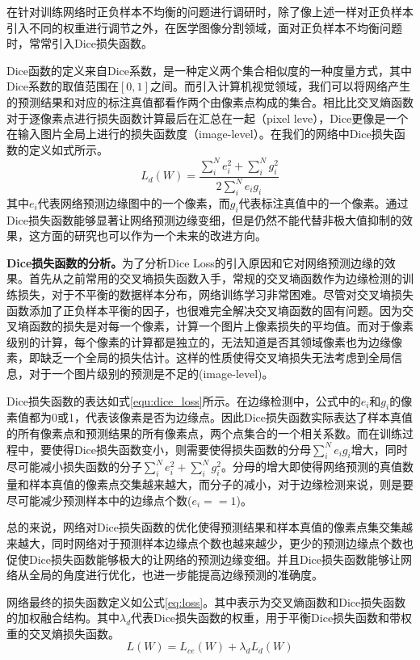 \documentclass[master]{thesis-uestc}
\begin{document}
{在针对训练网络时正负样本不均衡的问题进行调研时，除了像上述一样对正负样本引入不同的权重进行调节之外，在医学图像分割领域，面对正负样本不均衡问题时，常常引入Dice损失函数。

Dice函数的定义来自Dice系数，是一种定义两个集合相似度的一种度量方式，其中Dice系数的取值范围在$[0,1]$之间。而引入计算机视觉领域，我们可以将网络产生的预测结果和对应的标注真值都看作两个由像素点构成的集合。相比比交叉熵函数对于逐像素点进行损失函数计算最后在汇总在一起（pixel leve），Dice更像是一个在输入图片全局上进行的损失函数度（image-level）。在我们的网络中Dice损失函数的定义如式所示。
\begin{equation}
    L_{d}(W) = \frac{\sum_{i}^{N}e_{i}^{2} + \sum_{i}^{N}g_{i}^{2}}{2\sum_{i}^{N}e_{i}g_{i}}
    \label{equ:dice_loss}
\end{equation}
其中$e_{i}$代表网络预测边缘图中的一个像素，而$g_i$代表标注真值中的一个像素。通过Dice损失函数能够显著让网络预测边缘变细，但是仍然不能代替非极大值抑制的效果，这方面的研究也可以作为一个未来的改进方向。

\textbf{Dice损失函数的分析。}为了分析Dice Loss的引入原因和它对网络预测边缘的效果。首先从之前常用的交叉墒损失函数入手，常规的交叉墒函数作为边缘检测的训练损失，对于不平衡的数据样本分布，网络训练学习非常困难。尽管对交叉墒损失函数添加了正负样本平衡的因子，也很难完全解决交叉墒函数的固有问题。因为交叉墒函数的损失是对每一个像素，计算一个图片上像素损失的平均值。而对于像素级别的计算，每个像素的计算都是独立的，无法知道是否其领域像素也为边缘像素，即缺乏一个全局的损失估计。这样的性质使得交叉墒损失无法考虑到全局信息，对于一个图片级别的预测是不足的(image-level)。

Dice损失函数的表达如式\ref{equ:dice_loss}所示。在边缘检测中，公式中的$e_{i}$和$g_i$的像素值都为0或1，代表该像素是否为边缘点。因此Dice损失函数实际表达了样本真值的所有像素点和预测结果的所有像素点，两个点集合的一个相关系数。而在训练过程中，要使得Dice损失函数变小，则需要使得损失函数的分母$\sum_{i}^{N}e_{i}g_{i}$增大，同时尽可能减小损失函数的分子$\sum_{i}^{N}e_{i}^{2} + \sum_{i}^{N}g_{i}^{2}$。分母的增大即使得网络预测的真值数量和样本真值的像素点交集越来越大，而分子的减小，对于边缘检测来说，则是要尽可能减少预测样本中的边缘点个数($e_{i}==1$)。

总的来说，网络对Dice损失函数的优化使得预测结果和样本真值的像素点集交集越来越大，同时网络对于预测样本边缘点个数也越来越少，更少的预测边缘点个数也促使Dice损失函数能够极大的让网络的预测边缘变细。并且Dice损失函数能够让网络从全局的角度进行优化，也进一步能提高边缘预测的准确度。

网络最终的损失函数定义如公式\eqref{eq:loss}。其中表示为交叉熵函数和Dice损失函数的加权融合结构。其中$\lambda_d$代表Dice损失函数的权重，用于平衡Dice损失函数和带权重的交叉熵损失函数。
\begin{equation}
    L(W) = L_{ce}(W) + \lambda_{d} L_{d}(W)
\label{eq:loss}
\end{equation}

}
\end{document}
